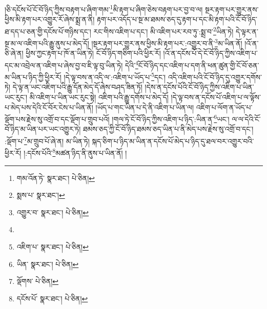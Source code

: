 །ཅི་དངོས་པོ་ངོ་བོ་ཉིད་ཀྱིས་བརྟག་པ་ཞིག་གམ་\footnote{གམ་འོན་ཏེ་  སྣར་ཐང་།  པེ་ཅིན། }མི་རྟག་པ་ཞིག་ཅེས་བརྟག་པར་བྱ་བ་ལ། སྔར་རྟག་པར་གྱུར་ནས་ཕྱིས་མི་རྟག་པར་འགྱུར་རོ་ཞེས་སྨྲ་ན་ནི། རྟག་པར་འདོད་པ་སྔ་མ་ཐམས་ཅད་དུ་རྟག་པ་དང་མི་རྟག་པའི་ངོ་བོ་ཉིད་ཐ་དད་པ་ཅན་གྱི་དངོས་པོ་གཉིས་དང་། རང་གིས་འཇིག་པ་དང་། མི་འཇིག་པར་རབ་ཏུ་:སྨྲ་བ་\footnote{སྨས་པ་  སྣར་ཐང་། }ཡིན་ཏེ། དེ་ལྟར་ན་སྔ་མ་ལ་འཇིག་པའི་རྒྱུ་ནུས་པ་མེད་དོ། །སྔར་རྟག་པར་གྱུར་ནས་ཕྱིས་མི་རྟག་པར་:འགྱུར་བ་ནི་\footnote{འགྱུར་བ་  སྣར་ཐང་།  པེ་ཅིན། }མ་ཡིན་ནོ། །འོ་ན་ཅི་ཞེ་ན། ཕྱིས་ཀྱང་རྟག་པ་ཁོ་ན་ཡིན་ཏེ། ངོ་བོ་ཉིད་གཅིག་པའི་ཕྱིར་རོ། །འོ་ན་དངོས་པོ་དེ་ངོ་བོ་ཉིད་ཀྱིས་འཇིག་པ་དང་མ་འབྲེལ་ན་འཇིག་པ་ཞེས་བྱ་བ་ཇི་ལྟ་བུ་ཡིན་ཏེ། དེའི་\footnote{}ངོ་བོ་ཉིད་དང་འཇིག་པ་དག་ནི་ཕན་ཚུན་གྱི་ངོ་བོ་ཅན་མ་ཡིན་པ་ཉིད་ཀྱི་ཕྱིར་རོ། །དེ་ལྟ་བས་ན་འདི་ལ་:འཇིག་པ་ཡོད་པ་\footnote{འཇིག་པ་  སྣར་ཐང་།  པེ་ཅིན། }དང་། འདི་འཇིག་པའི་ངོ་བོ་ཉིད་དུ་འགྱུར་དགོས་ཏེ། དེ་ལྟ་ན་ཡང་འཇིག་པའི་རྒྱུ་དོན་མེད་དོ་ཞེས་བཤད་ཟིན་ཏོ། །དེས་ན་དངོས་པོའི་ངོ་བོ་ཉིད་ཀྱིས་འཇིག་པ་ཡིན་ཡང་རུང་། མི་འཇིག་པ་ཡིན་ཡང་རུང་སྟེ། འཇིག་པའི་རྒྱུ་དགོས་པ་མེད་དོ། །དེ་ལྟ་བས་ན་དངོས་པོ་འཇིག་པ་ལ་ལྟོས་པ་མེད་པས་དེའི་ངོ་བོར་ངེས་པ་ཡིན་ནོ། །ཡོད་པ་གང་ཡིན་པ་དེ་ནི་འཇིག་པ་ཡིན་ལ། འཇིག་པ་ལོག་ན་ཡོད་པ་ལྡོག་པས་རྗེས་སུ་འགྲོ་བ་དང་ལྡོག་པ་གྲུབ་པའོ། །གལ་ཏེ་ངོ་བོ་ཉིད་ཀྱིས་འཇིག་པ་ཉིད་:ཡིན་ན་\footnote{ཡིན་  སྣར་ཐང་།  པེ་ཅིན། }ཡང་། ལ་ལ་དེའི་ངོ་བོ་ཉིད་མ་ཡིན་པར་ཡང་འགྱུར་ཏེ། ཐམས་ཅད་ཀྱི་ངོ་བོ་ཉིད་ཐམས་ཅད་ཡིན་པ་ནི་མེད་པས་རྗེས་སུ་འགྲོ་བ་དང་། :ལྡོག་པ་\footnote{ལྡོགས་  པེ་ཅིན། }མ་གྲུབ་པོ་ཞེ་ན། མ་ཡིན་ཏེ། སྐད་ཅིག་པ་ཉིད་མ་ཡིན་ན་དངོས་པོ་མེད་པ་ཉིད་དུ་ཐལ་བར་འགྱུར་བའི་ཕྱིར་རོ། །:དངོས་པོའི་\footnote{དངོས་པོ་  སྣར་ཐང་།  པེ་ཅིན། }མཚན་ཉིད་ནི་ནུས་པ་ཡིན་ནོ། །
